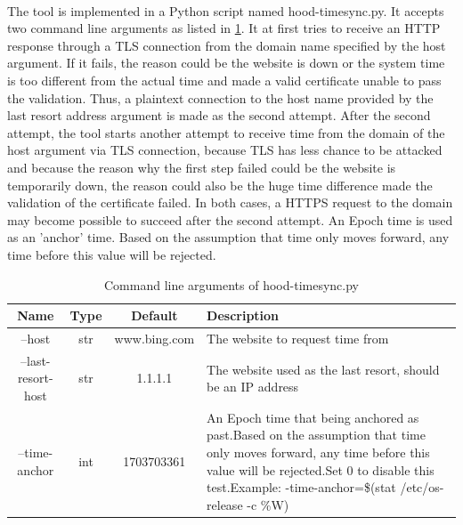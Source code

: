 \documentclass[mscthesis]{usiinfthesis}
\begin{document}
\paragraph{}
The tool is implemented in a Python script named hood-timesync.py. It accepts two command line arguments as listed in \cref{tab:timesync_cmdarg}. It at first tries to receive an HTTP response through a TLS connection from the domain name specified by the host argument. If it fails, the reason could be the website is down or the system time is too different from the actual time and made a valid certificate unable to pass the validation. Thus, a plaintext connection to the host name provided by the last resort address argument is made as the second attempt. After the second attempt, the tool starts another attempt to receive time from the domain of the host argument via TLS connection, because TLS has less chance to be attacked and because the reason why the first step failed could be the website is temporarily down, the reason could also be the huge time difference made the validation of the certificate failed. In both cases, a HTTPS request to the domain may become possible to succeed after the second attempt. An Epoch time is used as an 'anchor' time. Based on the assumption that time only moves forward, any time before this value will be rejected.

\begin{table}[H]
  \centering
  \begin{tabular}{|c|c|c|m{68mm}|}
    \hline
    Name               & Type & Default      & Description                                                                                                                                                                                                                                               \\
    \hline
    --host             & str  & www.bing.com & The website to request time from                                                                                                                                                                                                                          \\
    --last-resort-host & str  & 1.1.1.1      & The website used as the last resort, should be an IP address                                                                                                                                                                                              \\
    --time-anchor      & int  & 1703703361   & An Epoch time that being anchored as past.\newline Based on the assumption that time only moves forward, any time before this value will be rejected.\newline Set 0 to disable this test.\newline Example: -\-time-anchor=\$(stat /etc/os-release -c \%W) \\
    \hline
  \end{tabular}
  \caption{Command line arguments of hood-timesync.py}
  \label{tab:timesync_cmdarg}
\end{table}
\end{document}
